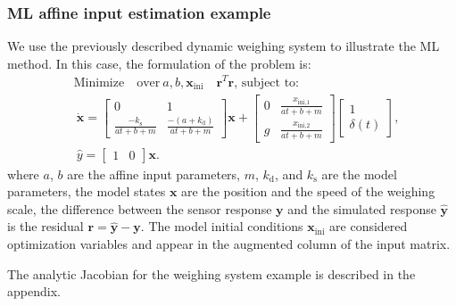 \subsubsection{ML affine input estimation example}
We use the previously described dynamic weighing system to illustrate the ML method.
In this case, the formulation of the problem is: 
 \begin{equation} \begin{aligned}
     & \text{Minimize} \quad \text{over} \ a, b, \mathbf{x}_{\text{ini}} \quad \mathbf{r}^T \mathbf{r} \text{, subject to:} \\ & \ \dot{\mathbf{x}} = \begin{bmatrix} 0 & 1 \\ \frac{-k_{\mathrm{s}}}{a t + b + m} & \frac{-(a + k_{\mathrm{d}})}{a t + b + m} \end{bmatrix} \mathbf{x} + \begin{bmatrix} 0 & \frac{x_{\text{ini,1}}}{a t + b + m} \\ g & \frac{x_{\text{ini,2}}}{a t + b + m}  \end{bmatrix} \begin{bmatrix} 1 \\ \delta(t)  \end{bmatrix}, \\ & \ \widehat{y} = \begin{bmatrix} 1 & 0  \end{bmatrix} \mathbf{x} .  
 \end{aligned} \end{equation}
where $a$, $b$ are the affine input parameters, $m$, $k_{\mathrm{d}}$, and $k_{\mathrm{s}}$ are the model parameters, the model states $\mathbf{x}$ are the position and the speed of the weighing scale, the difference between the sensor response $\mathbf{y}$ and the simulated response $\widehat{\mathbf{y}}$ is the residual $\mathbf{r} = \widehat{\mathbf{y}} - \mathbf{y}$.  
The model initial conditions $\mathbf{x}_{\text{ini}}$ are considered optimization variables
and appear in the augmented column of the input matrix. 

The analytic Jacobian for the weighing system example is described in the appendix.

